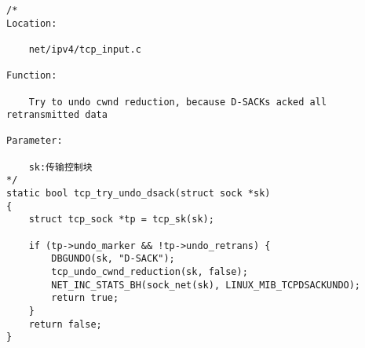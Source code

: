         \subsubsection{\texttt{}}
\begin{verbatim}
/*
Location:

    net/ipv4/tcp_input.c

Function:

    Try to undo cwnd reduction, because D-SACKs acked all retransmitted data

Parameter:

    sk:传输控制块
*/
static bool tcp_try_undo_dsack(struct sock *sk)
{
    struct tcp_sock *tp = tcp_sk(sk);

    if (tp->undo_marker && !tp->undo_retrans) {
        DBGUNDO(sk, "D-SACK");
        tcp_undo_cwnd_reduction(sk, false);
        NET_INC_STATS_BH(sock_net(sk), LINUX_MIB_TCPDSACKUNDO);
        return true;
    }
    return false;
}
\end{verbatim}
